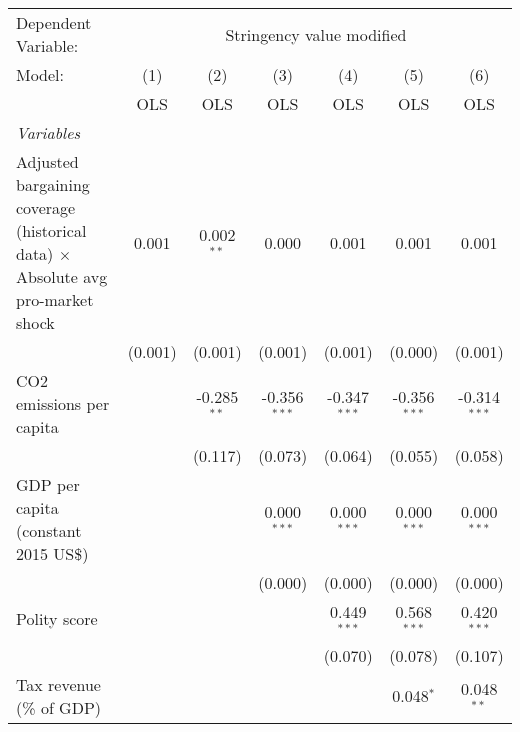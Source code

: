 
\begingroup
\centering
\begin{tabular}{lcccccc}
   \toprule
   Dependent Variable: & \multicolumn{6}{c}{Stringency value modified}\\
   Model:                                                                                 & (1)     & (2)           & (3)            & (4)            & (5)            & (6)\\  
                                                                                          &  OLS    & OLS           & OLS            & OLS            & OLS            & OLS\\  
   \midrule
   \emph{Variables}\\
   Adjusted bargaining coverage (historical data) $\times$ Absolute avg pro-market shock  & 0.001   & 0.002$^{**}$  & 0.000          & 0.001          & 0.001          & 0.001\\   
                                                                                          & (0.001) & (0.001)       & (0.001)        & (0.001)        & (0.000)        & (0.001)\\   
   CO2 emissions per capita                                                               &         & -0.285$^{**}$ & -0.356$^{***}$ & -0.347$^{***}$ & -0.356$^{***}$ & -0.314$^{***}$\\   
                                                                                          &         & (0.117)       & (0.073)        & (0.064)        & (0.055)        & (0.058)\\   
   GDP per capita (constant 2015 US\$)                                                    &         &               & 0.000$^{***}$  & 0.000$^{***}$  & 0.000$^{***}$  & 0.000$^{***}$\\   
                                                                                          &         &               & (0.000)        & (0.000)        & (0.000)        & (0.000)\\   
   Polity score                                                                           &         &               &                & 0.449$^{***}$  & 0.568$^{***}$  & 0.420$^{***}$\\   
                                                                                          &         &               &                & (0.070)        & (0.078)        & (0.107)\\   
   Tax revenue (\% of GDP)                                                                &         &               &                &                & 0.048$^{*}$    & 0.048$^{**}$\\   

\end{tabular}
